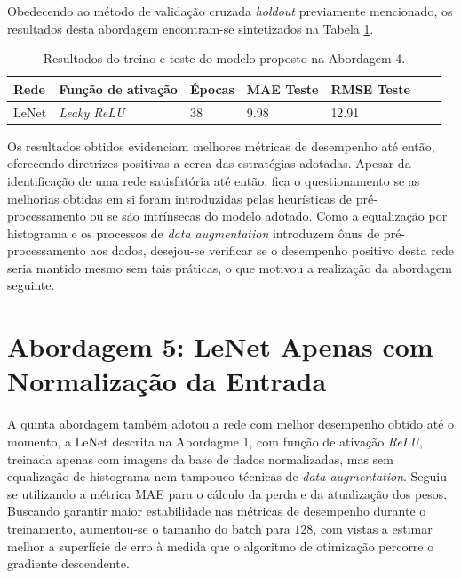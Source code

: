 	Obedecendo ao método de validação cruzada \emph{holdout} previamente mencionado, os resultados desta abordagem encontram-se sintetizados na Tabela \ref{tab:results-4}.

	\begin{table}[!ht]
		\centering
		\caption{Resultados do treino e teste do modelo proposto na Abordagem 4.}
		\label{tab:results-4}
			\begin{tabular}{l l l l l l l}
				\toprule
				Rede & Função de ativação & Épocas & MAE Teste & RMSE Teste \\
				\midrule
				LeNet & \emph{Leaky ReLU} & 38 & 9.98 & 12.91 \\
				\bottomrule
			\end{tabular}
	\end{table}

	Os resultados obtidos evidenciam melhores métricas de desempenho até então, oferecendo diretrizes positivas a cerca das estratégias adotadas. Apesar da identificação de uma rede satisfatória até então, fica o questionamento se as melhorias obtidas em si foram introduzidas pelas heurísticas de pré-processamento ou se são intrínsecas do modelo adotado. Como a equalização por histograma e os processos de \emph{data augmentation} introduzem ônus de pré-processamento aos dados, desejou-se verificar se o desempenho positivo desta rede seria mantido mesmo sem tais práticas, o que motivou a realização da abordagem seguinte.

\section{Abordagem 5: LeNet Apenas com Normalização da Entrada}%
	A quinta abordagem também adotou a rede com melhor desempenho obtido até o momento, a LeNet descrita na Abordagme 1, com função de ativação \emph{ReLU}, treinada apenas com imagens da base de dados normalizadas, mas sem equalização de histograma nem tampouco técnicas de \emph{data augmentation}. Seguiu-se utilizando a métrica MAE para o cálculo da perda e da atualização dos pesos. Buscando garantir maior estabilidade nas métricas de desempenho durante o treinamento, aumentou-se o tamanho do batch para $128$, com vistas a estimar melhor a superfície de erro à medida que o algoritmo de otimização percorre o gradiente descendente.

